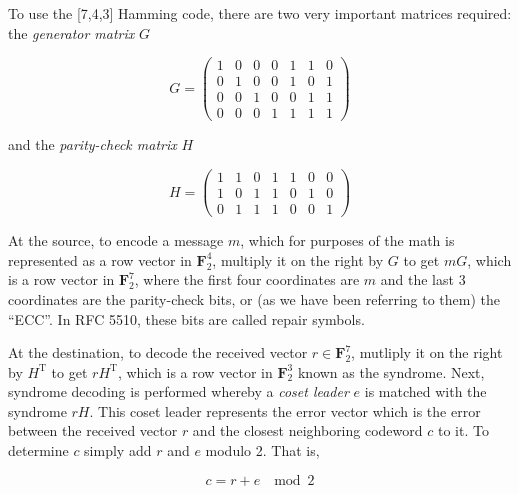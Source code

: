 \documentclass[conference]{IEEEtran}
\theoremstyle{definition}
\begin{document}
To use the [7,4,3] Hamming code, there are two very
important matrices required: the \emph{generator matrix}
$G$

$$
G = \left( 
\begin{matrix}
  1 & 0 & 0 & 0 & 1 & 1 & 0 \\
  0 & 1 & 0 & 0 & 1 & 0 & 1 \\
  0 & 0 & 1 & 0 & 0 & 1 & 1 \\
  0 & 0 & 0 & 1 & 1 & 1 & 1
 \end{matrix}
\right)
$$

and the \emph{parity-check matrix} $H$

$$
H = \left( 
\begin{matrix}
  1 & 1 & 0 & 1 & 1 & 0 & 0 \\
  1 & 0 & 1 & 1 & 0 & 1 & 0 \\
  0 & 1 & 1 & 1 & 0 & 0 & 1
 \end{matrix}
\right)
$$


At the source, to encode a message $m$, which for purposes
of the math is represented as a row vector in $\mathbf{F}^4_2$,
multiply it on the right by $G$ to get $mG$, which is
a row vector in $\mathbf{F}^7_2$, where the first four
coordinates are $m$ and the last 3 coordinates are the
parity-check bits, or (as we have been referring to them)
the ``ECC''.  In RFC 5510\cite{lacan2009reed}, these bits
are called repair symbols.

At the destination, to decode the received vector $r\in\mathbf{F}^7_2$,
mutliply it on the right by $H^\text{T}$ to get $rH^\text{T}$, which is
a row vector in $\mathbf{F}^3_2$ known as the syndrome.  Next, syndrome
decoding is performed whereby a \emph{coset leader} $e$ is matched
with the syndrome $rH$. This coset leader represents the error vector
which is the error between the received vector $r$ and the closest
neighboring codeword $c$ to it. To determine $c$ simply add $r$ and
$e$ modulo 2. That is,

$$
c = r + e\; \mod 2
$$
\end{document}
